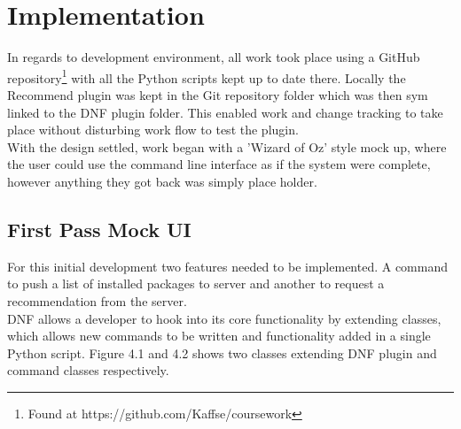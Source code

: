 \documentclass{l4proj}
\begin{document}
\chapter{Implementation}
In regards to development environment, all work took place using a GitHub repository\footnote{Found at https://github.com/Kaffse/coursework} with all the Python scripts kept up to date there. Locally the Recommend plugin was kept in the Git repository folder which was then sym linked to the DNF plugin folder. This enabled work and change tracking to take place without disturbing work flow to test the plugin.\\
With the design settled, work began with a 'Wizard of Oz'\cite{wizofoz} style mock up, where the user could use the command line interface as if the system were complete, however anything they got back was simply place holder.

\section{First Pass Mock UI}
For this initial development two features needed to be implemented. A command to push a list of installed packages to server and another to request a recommendation from the server.\\
DNF allows a developer to hook into its core functionality by extending classes, which allows new commands to be written and functionality added in a single Python script. Figure 4.1 and 4.2 shows two classes extending DNF plugin and command classes respectively.
\begin{figure}

\end{figure}
\begin{figure}

\end{figure}
\end{document}
